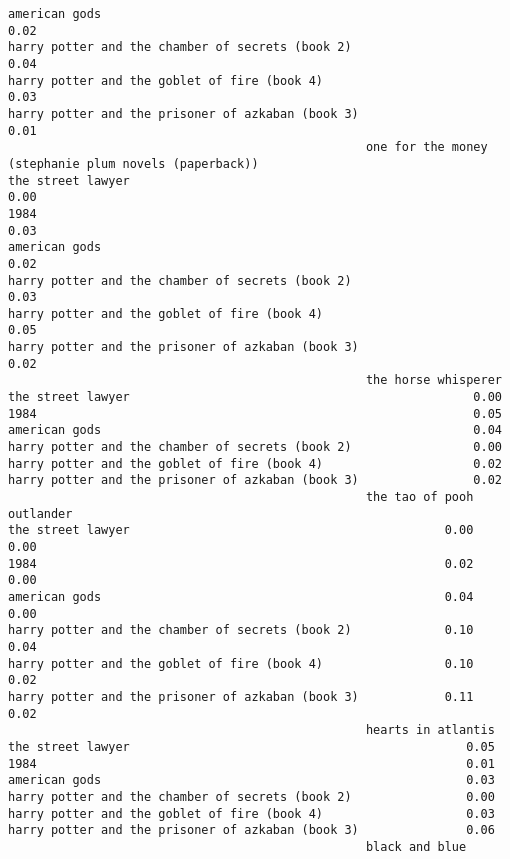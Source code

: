 \documentclass[
]{report}
\begin{document}
\begin{verbatim}
american gods                                                              0.02
harry potter and the chamber of secrets (book 2)                           0.04
harry potter and the goblet of fire (book 4)                               0.03
harry potter and the prisoner of azkaban (book 3)                          0.01
                                                  one for the money (stephanie plum novels (paperback))
the street lawyer                                                                                  0.00
1984                                                                                               0.03
american gods                                                                                      0.02
harry potter and the chamber of secrets (book 2)                                                   0.03
harry potter and the goblet of fire (book 4)                                                       0.05
harry potter and the prisoner of azkaban (book 3)                                                  0.02
                                                  the horse whisperer
the street lawyer                                                0.00
1984                                                             0.05
american gods                                                    0.04
harry potter and the chamber of secrets (book 2)                 0.00
harry potter and the goblet of fire (book 4)                     0.02
harry potter and the prisoner of azkaban (book 3)                0.02
                                                  the tao of pooh outlander
the street lawyer                                            0.00      0.00
1984                                                         0.02      0.00
american gods                                                0.04      0.00
harry potter and the chamber of secrets (book 2)             0.10      0.04
harry potter and the goblet of fire (book 4)                 0.10      0.02
harry potter and the prisoner of azkaban (book 3)            0.11      0.02
                                                  hearts in atlantis
the street lawyer                                               0.05
1984                                                            0.01
american gods                                                   0.03
harry potter and the chamber of secrets (book 2)                0.00
harry potter and the goblet of fire (book 4)                    0.03
harry potter and the prisoner of azkaban (book 3)               0.06
                                                  black and blue

\end{verbatim}
\end{document}
